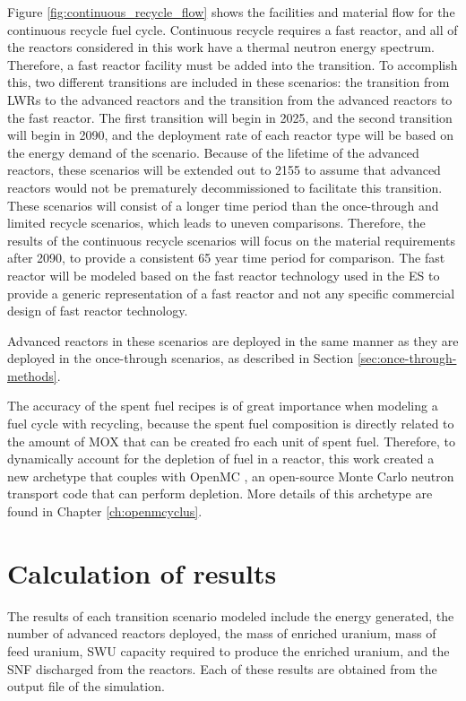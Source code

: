 Figure \ref{fig:continuous_recycle_flow} shows the facilities and material 
flow for the continuous recycle fuel cycle. Continuous recycle 
requires a fast reactor, and all of the reactors considered in this 
work have a thermal neutron energy spectrum. Therefore, a fast reactor 
facility 
must be added into the transition. To accomplish this, two different 
transitions are included in these scenarios: the transition from 
\glspl{LWR} to the advanced reactors and the transition from the 
advanced reactors to the fast reactor. The first transition will begin 
in 2025, and the second transition will begin in 2090, and the deployment 
rate of each reactor type will be based on the energy demand of the 
scenario. Because of the lifetime of the advanced reactors, these scenarios 
will be extended out to 2155 to assume that advanced reactors would not 
be prematurely decommissioned to facilitate this transition. These 
scenarios will consist of a longer time period than the once-through 
and limited recycle scenarios, which leads to uneven comparisons. Therefore, 
the results of the continuous recycle scenarios will focus on the 
material requirements after 2090, to provide a consistent 65 year 
time period for comparison. 
The fast reactor will be modeled 
based on the fast reactor technology used in the \gls{ES} 
\cite{wigeland_nuclear_2014} to provide a generic representation of 
a fast reactor and not any specific commercial design of fast reactor 
technology. 



Advanced reactors in these scenarios are deployed in the same manner 
as they are deployed in the once-through scenarios, as described in 
Section \ref{sec:once-through-methods}. 

The accuracy of the spent fuel recipes is of great importance 
when modeling a fuel cycle with recycling, because the spent fuel 
composition is directly related to the amount of \gls{MOX} that 
can be created fro each unit of spent fuel. Therefore, to 
dynamically account for the depletion of fuel in a reactor, 
this work created a new \Cyclus archetype that couples \Cyclus with 
OpenMC \cite{romano_openmc:_2015}, an open-source Monte Carlo 
neutron transport code that can perform depletion. More details 
of this archetype are found in Chapter \ref{ch:openmcyclus}.
 

\section{Calculation of results} \label{sec:results_calc}
The results of each transition scenario modeled include the energy generated, 
the number of advanced reactors deployed, the mass of enriched uranium, 
mass of feed uranium, \gls{SWU} capacity required to produce the enriched 
uranium, and the \gls{SNF} discharged from the reactors. Each of these results 
are obtained from the \Cyclus output file of the simulation. 

